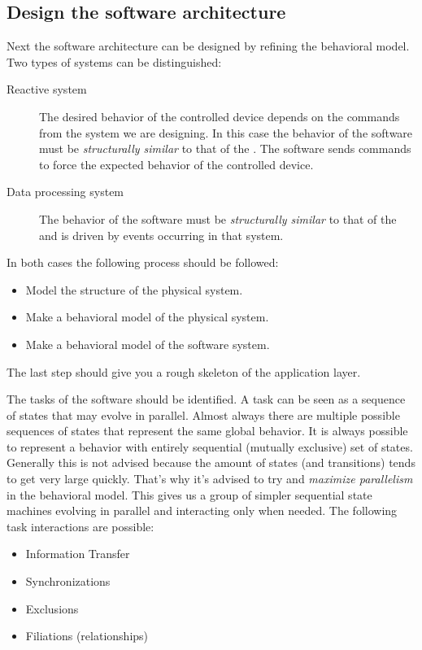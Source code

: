 \documentclass[../main.tex]{subfiles}
\begin{document}
\subsection{Design the software architecture}
\label{sss:design}
Next the  software architecture can be designed by refining the  behavioral model. 
Two types of systems can be distinguished:
\begin{description}
	\item[ Reactive system] The desired behavior of the controlled device depends on the commands from the system we are designing.
		In this case the behavior of the software must be \emph{structurally similar} to that of the .
		The software sends commands to force the expected behavior of the controlled device.
	\item[ Data processing system] The behavior of the software must be \emph{structurally similar} to that of the  and is driven by events occurring in that system.
\end{description}

In both cases the following process should be followed:
\begin{itemize}
	\item Model the structure of the physical system. 
	\item Make a  behavioral model of the physical system.
	\item Make a behavioral model of the software system.
\end{itemize}

The last step should give you a rough skeleton of the  application layer.

The tasks of the software should be identified.
A task can be seen as a sequence of states that may evolve in parallel.
Almost always there are multiple possible sequences of states that represent the same global behavior.
It is always possible to represent a behavior with entirely sequential (mutually exclusive) set of states.
Generally this is not advised because the amount of states (and transitions) tends to get very large quickly.
That's why it's advised to try and \emph{maximize parallelism} in the behavioral model.
This gives us a group of simpler sequential state machines evolving in parallel and interacting only when needed.
The following  task interactions are possible:
\begin{itemize}
	\item Information Transfer
	\item Synchronizations 
	\item Exclusions 
	\item Filiations (relationships)
\end{itemize}
\end{document}
